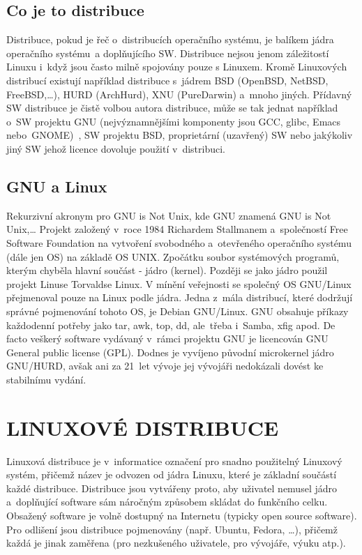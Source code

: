 \documentclass[a4paper,12pt]{article}
\newcommand{\upc}[1]{\uppercase{#1}} %
\begin{document}
\subsection{Co je to distribuce}
Distribuce, pokud je řeč o~distribucích operačního systému, je balíkem jádra operačního systému~a doplňujícího SW. Distribuce nejsou jenom záležitostí Linuxu i~když jsou často milně spojovány pouze s Linuxem. Kromě Linuxových distribucí existují například distribuce s~jádrem BSD (OpenBSD, NetBSD, FreeBSD,…), HURD (ArchHurd), XNU (PureDarwin) a~mnoho jiných. Přídavný SW distribuce je čistě volbou autora distribuce, může se tak jednat například o~SW projektu GNU (nejvýznamnějšími komponenty jsou GCC, glibc, Emacs nebo~GNOME)~\cite{GNUweb}, SW projektu BSD, proprietární (uzavřený) SW nebo jakýkoliv jiný SW jehož licence dovoluje použití v~distribuci.

\subsection{GNU a Linux} 
Rekurzivní akronym pro GNU is Not Unix, kde GNU znamená GNU is Not Unix,…
Projekt založený v~roce 1984 Richardem Stallmanem a~společností Free Software Foundation na vytvoření svobodného a~otevřeného operačního systému (dále jen OS) na základě OS UNIX. Zpočátku soubor systémových programů, kterým chyběla hlavní součást - jádro (kernel). Později se jako jádro použil projekt Linuse Torvaldse Linux. V mínění veřejnosti se společný OS GNU/Linux přejmenoval pouze na Linux podle jádra. Jedna z~mála distribucí, které dodržují správné pojmenování tohoto OS, je Debian GNU/Linux.
GNU obsahuje příkazy každodenní potřeby jako tar, awk, top, dd, ale~třeba i~Samba, xfig apod. De facto veškerý software vydávaný v~rámci projektu GNU je licencován GNU General public license (GPL). Dodnes je vyvíjeno původní microkernel jádro GNU/HURD, avšak ani za 21~let vývoje jej vývojáři nedokázali dovést ke stabilnímu vydání.~\cite{GNUABCLinuxu}~\cite{GNUweb}~\cite{ROOT_HURD}


\section{\upc{Linuxové distribuce}}
Linuxová distribuce je v~informatice označení pro snadno použitelný Linuxový systém, přičemž název je odvozen od jádra Linuxu, které je základní součástí každé distribuce. Distribuce jsou vytvářeny proto, aby uživatel nemusel jádro a~doplňující software sám náročným způsobem skládat do funkčního celku. Obsažený software je volně dostupný na Internetu (typicky open source software). Pro odlišení jsou distribuce pojmenovány (např. Ubuntu, Fedora, …), přičemž každá je jinak zaměřena (pro nezkušeného uživatele, pro vývojáře, výuku atp.).\cite{WDIST}
\end{document}
